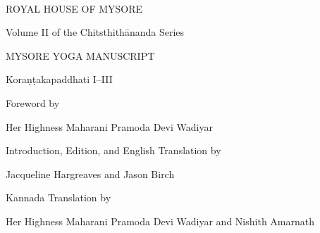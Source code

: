 \thispagestyle{empty}
~\vskip 0.5cm
\begin{center}
{\coverbold\fontsize{30}{34}\selectfont\color{coverred} ROYAL HOUSE OF MYSORE\par}
\vspace{0.55cm}
{\headingfont\fontsize{20}{24}\selectfont\color{deepmaroon} Volume II of the {\coverlightItalic Chitsthithānanda} Series\par}
\vfill
{\coversemibold\fontsize{34}{36}\selectfont\color{deepmaroon} MYSORE YOGA MANUSCRIPT\par}
\vspace{0.65cm}
{\coverbolditalic\fontsize{29}{32}\selectfont\color{deepmaroon} Koraṇṭakapaddhati I{\rm --}III\par}
\vfill
{\headingfont\fontsize{12}{15}\selectfont\color{deepmaroon} Foreword by\par}
{\headingfont\fontsize{16}{20}\selectfont\color{deepmaroon} Her Highness Maharani Pramoda Devi Wadiyar\par}
\vspace{0.5cm}
{\headingfont\fontsize{12}{15}\selectfont\color{deepmaroon}
Introduction, Edition, and English Translation by\par}

{\headingfont\fontsize{16}{20}\selectfont\color{deepmaroon}
Jacqueline Hargreaves and Jason Birch\par}

\vspace{0.55cm}

{\headingfont\fontsize{12}{15}\selectfont\color{deepmaroon}
Kannada Translation by\par}

{\headingfont\fontsize{16}{20}\selectfont\color{deepmaroon}
Her Highness Maharani Pramoda Devi Wadiyar and Nishith Amarnath\par}
\end{center}














